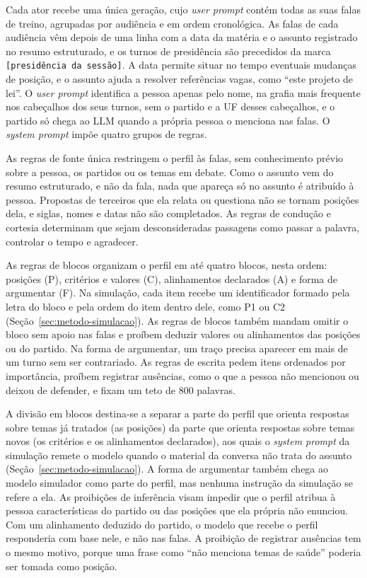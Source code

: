 Cada ator recebe uma única geração, cujo \textit{user prompt} contém todas as suas falas de treino,
agrupadas por audiência e em ordem cronológica. As falas de cada audiência vêm depois de uma linha
com a data da matéria e o assunto registrado no resumo estruturado, e os turnos de presidência são
precedidos da marca \texttt{[presidência da sessão]}. A data permite situar no tempo eventuais
mudanças de posição, e o assunto ajuda a resolver referências vagas, como ``este projeto de lei''. O
\textit{user prompt} identifica a pessoa apenas pelo nome, na grafia mais frequente nos cabeçalhos dos
seus turnos, sem o partido e a UF desses cabeçalhos, e o partido só chega ao LLM quando a própria pessoa o menciona nas falas. O
\textit{system prompt} impõe quatro grupos de regras.

As regras de fonte única restringem o perfil às falas, sem conhecimento prévio sobre a pessoa, os
partidos ou os temas em debate. Como o assunto vem do resumo estruturado, e não da fala, nada que
apareça só no assunto é atribuído à pessoa. Propostas de terceiros que ela relata ou questiona não se
tornam posições dela, e siglas, nomes e datas não são completados. As regras de condução e cortesia
determinam que sejam desconsideradas passagens como passar a palavra, controlar o tempo e agradecer.

As regras de blocos organizam o perfil em até quatro blocos, nesta ordem: posições (P), critérios e
valores (C), alinhamentos declarados (A) e forma de argumentar (F). Na simulação, cada item recebe um
identificador formado pela letra do bloco e pela ordem do item dentro dele, como P1 ou C2
(Seção~\ref{sec:metodo-simulacao}). As regras de blocos também mandam omitir o bloco sem apoio nas
falas e proíbem deduzir valores ou alinhamentos das posições ou do partido. Na forma de argumentar,
um traço precisa aparecer em mais de um turno sem ser contrariado. As regras de escrita pedem itens ordenados por importância,
proíbem registrar ausências, como o que a pessoa não mencionou ou deixou de defender, e fixam um teto
de 800 palavras.

A divisão em blocos destina-se a separar a parte do perfil que orienta respostas sobre temas já
tratados (as posições) da parte que orienta respostas sobre temas novos (os critérios e os
alinhamentos declarados), aos quais o \textit{system prompt} da simulação remete o modelo quando o
material da conversa não trata do assunto (Seção~\ref{sec:metodo-simulacao}). A forma de argumentar
também chega ao modelo simulador como parte do perfil, mas nenhuma instrução da simulação se refere a
ela. As proibições de inferência visam impedir que o perfil atribua à pessoa características do partido ou das posições
que ela própria não enunciou. Com um alinhamento deduzido do partido, o modelo que recebe o perfil
responderia com base nele, e não nas falas. A proibição de registrar ausências tem o mesmo motivo,
porque uma frase como ``não menciona temas de saúde'' poderia ser tomada como posição.

